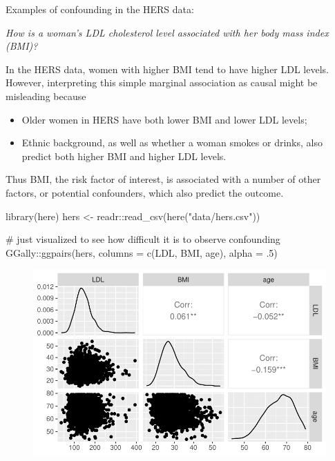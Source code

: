 \documentclass[
  letterpaper,
  DIV=11,
  numbers=noendperiod]{scrreport}
\newenvironment{Shaded}{\begin{snugshade}}{\end{snugshade}}
\newcommand{\AttributeTok}[1]{\textcolor[rgb]{0.40,0.45,0.13}{#1}}
\newcommand{\CommentTok}[1]{\textcolor[rgb]{0.37,0.37,0.37}{#1}}
\newcommand{\DecValTok}[1]{\textcolor[rgb]{0.68,0.00,0.00}{#1}}
\newcommand{\FunctionTok}[1]{\textcolor[rgb]{0.28,0.35,0.67}{#1}}
\newcommand{\NormalTok}[1]{\textcolor[rgb]{0.00,0.23,0.31}{#1}}
\newcommand{\OtherTok}[1]{\textcolor[rgb]{0.00,0.23,0.31}{#1}}
\newcommand{\SpecialCharTok}[1]{\textcolor[rgb]{0.37,0.37,0.37}{#1}}
\newcommand{\StringTok}[1]{\textcolor[rgb]{0.13,0.47,0.30}{#1}}
\providecommand{\tightlist}{%
  \setlength{\itemsep}{0pt}\setlength{\parskip}{0pt}}\usepackage{longtable,booktabs,array}
\begin{document}
Examples of confounding in the HERS data:

\emph{How is a woman's LDL cholesterol level associated with her body
mass index (BMI)?}

In the HERS data, women with higher BMI tend to have higher LDL levels.
However, interpreting this simple marginal association as causal might
be misleading because

\begin{itemize}
\tightlist
\item
  Older women in HERS have both lower BMI and lower LDL levels;
\item
  Ethnic background, as well as whether a woman smokes or drinks, also
  predict both higher BMI and higher LDL levels.
\end{itemize}

Thus BMI, the risk factor of interest, is associated with a number of
other factors, or potential confounders, which also predict the outcome.

\begin{Shaded}
\begin{Highlighting}[]
\FunctionTok{library}\NormalTok{(here)}
\NormalTok{hers }\OtherTok{\textless{}{-}}\NormalTok{ readr}\SpecialCharTok{::}\FunctionTok{read\_csv}\NormalTok{(}\FunctionTok{here}\NormalTok{(}\StringTok{"data/hers.csv"}\NormalTok{))}

\CommentTok{\# just visualized to see how difficult it is to observe confounding}
\NormalTok{GGally}\SpecialCharTok{::}\FunctionTok{ggpairs}\NormalTok{(hers, }\AttributeTok{columns =} \FunctionTok{c}\NormalTok{(}\StringTok{\textquotesingle{}LDL\textquotesingle{}}\NormalTok{, }\StringTok{\textquotesingle{}BMI\textquotesingle{}}\NormalTok{, }\StringTok{\textquotesingle{}age\textquotesingle{}}\NormalTok{), }\AttributeTok{alpha =}\NormalTok{ .}\DecValTok{5}\NormalTok{)}
\end{Highlighting}
\end{Shaded}

\begin{figure}[H]

{\centering \includegraphics{week2/week2_files/figure-pdf/unnamed-chunk-5-1.pdf}

}

\end{figure}
\end{document}
